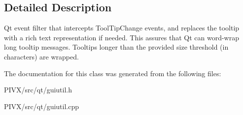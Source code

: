 \subsection{Detailed Description}
Qt event filter that intercepts Tool\+Tip\+Change events, and replaces the tooltip with a rich text representation if needed. This assures that Qt can word-\/wrap long tooltip messages. Tooltips longer than the provided size threshold (in characters) are wrapped. 

The documentation for this class was generated from the following files\+:\begin{DoxyCompactItemize}
\item 
P\+I\+V\+X/src/qt/guiutil.\+h\item 
P\+I\+V\+X/src/qt/guiutil.\+cpp\end{DoxyCompactItemize}
